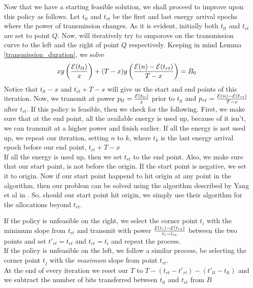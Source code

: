Now that we have a starting feasible solution, we shall proceed to improve upon this policy as follows. Let $t_{lt}$ and $t_{rt}$ be the first and last energy arrival epochs where the power of transmission changes. 
As it is evident, initially both $t_{lt}$ and $t_{rt}$ are set to point $Q$. Now, will iteratively try to omporove on the transmission curve to the left and the right of point $Q$ respectively. 
Keeping in mind Lemma \ref{transmission_duration}, we solve 
\begin{equation}
\label{xandy}
xg\left(\frac{\ETx(t_{lt})}{x}\right) + (T-x)g\left(\frac{\ETx(n)-\ETx(t_{rt})}{T-x}\right) = B_0
\end{equation}
Notice that $t_{lt} - x$ and $t_{rt} + T-x$ will give us the start and end points of this iteration. Now, we transmit at power $p_{lt} = \frac{\mathcal{E}(t_{lt})}{x}$ prior to $t_{lt}$ and $p_{rt} = \frac{\mathcal{E}(n) - \mathcal{E}(t_{rt})}{T-x}$ after $t_{rt}$. 
If this policy is feasible, then we check for the following. First, we make sure that at the end point, all the available energy is used up, because of it isn't, we can transmit at a higher power and finish earlier. 
If all the energy is not used up, we repeat our iteration, setting $n$ to $k$, where $t_k$ is the last energy arrival epoch before our end point, $t_{rt} + T-x$  \\
If all the energy is used up, then we set $t_{rt}$ to the end point. 
Also, we make sure that our start point, is not before the origin. If the start point is negative, we set it to origin. Now if our start point happend to hit origin at any point in the algorithm, then our problem can be 
solved using the algorithm described by Yang et al in \cite{Yang}. So, should our start point hit origin, we simply use their algorithm for the allocations beyond $t_{rt}$.

If the policy is unfeasible on the right, we select the corner point $t_i$ with the minimum slope from $t_{rt}$ and transmit with power $\frac{\mathcal{E}(t_i) - \mathcal{E}(t_{rt})}{t_i-t_{rt}}$ between the two points and set $t'_{rt} = t_{rt}$ and $t_{rt} = t_i$ and repeat the process.\\
If the policy is unfeasible on the left, we follow a similar process, be selecting the corner point $t_j$ with the \textit{maximum} slope from point $t_{rt}$.\\
At the end of every iteration we reset our $T$ to $ T - (t_{rt} - t'_{rt}) - (t'_{lt} - t_{lt})$ and we subtract the number of bits transferred between $t_{lt}$ and $t_{rt}$ from $B$

